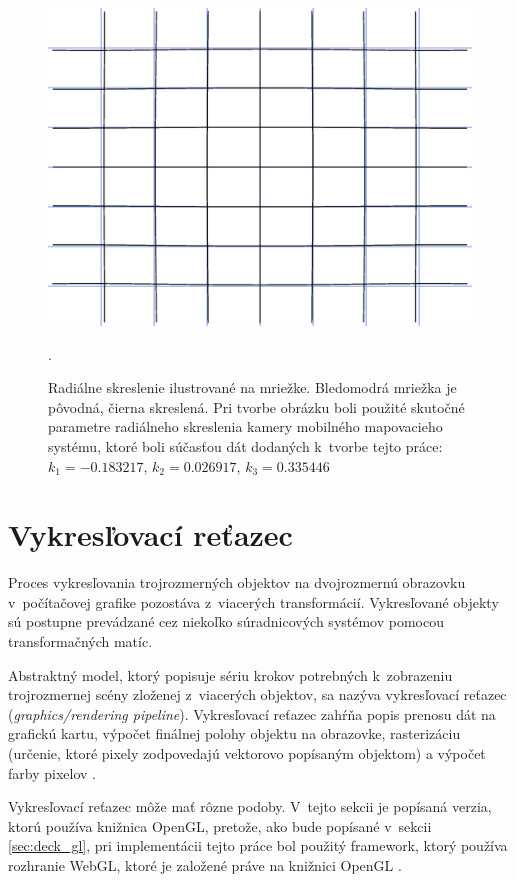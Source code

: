 \begin{figure}[t]
    \centering
    \includegraphics[width=0.6\linewidth]{text_prace/obrazky-figures/radialne_skreslenie.png}
    \caption[Radiálne skreslenie kamery ilustrované na mriežke.]{Radiálne skreslenie ilustrované na mriežke. Bledomodrá mriežka je pôvodná, čierna skreslená. Pri tvorbe obrázku boli použité skutočné parametre radiálneho skreslenia kamery mobilného mapovacieho systému, ktoré boli súčasťou dát dodaných k~tvorbe tejto práce: $k_1 = -0.183217$, $k_2 = 0.026917$, $k_3 = 0.335446$}.
    \label{fig:radialne_skreslenie}
\end{figure}

\section{Vykresľovací reťazec}

Proces vykresľovania trojrozmerných objektov na dvojrozmernú obrazovku v~počítačovej grafike pozostáva z~viacerých transformácií. Vykresľované objekty sú postupne prevádzané cez niekoľko súradnicových systémov pomocou transformačných matíc.

Abstraktný model, ktorý popisuje sériu krokov potrebných k~zobrazeniu trojrozmernej scény zloženej z~viacerých objektov, sa nazýva vykresľovací reťazec (\emph{graphics/rendering pipeline}). Vykresľovací reťazec zahŕňa popis prenosu dát na grafickú kartu, výpočet finálnej polohy objektu na obrazovke, rasterizáciu (určenie, ktoré pixely zodpovedajú vektorovo popísaným objektom) a výpočet farby pixelov \cite{stemkoski_graphics}.

Vykresľovací reťazec môže mať rôzne podoby. V~tejto sekcii je popísaná verzia, ktorú používa knižnica OpenGL, pretože, ako bude popísané v~sekcii \ref{sec:deck_gl}, pri implementácii tejto práce bol použitý framework, ktorý používa rozhranie WebGL, ktoré je založené práve na knižnici OpenGL \cite{webgl_overview}.

